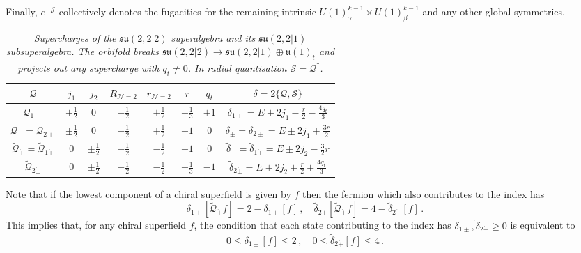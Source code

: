 \documentclass[main.tex]{subfiles}
\begin{document}
Finally, $e^{-\mathcal{J}}$ collectively denotes the fugacities for the remaining intrinsic $U(1)^{k-1}_{\gamma}\times  U(1)^{k-1}_{\beta}$ and any other global symmetries.
\begin{table}
\centering
\begin{tabular}{ |c||c|c|c|c|c|c|c| } 
 \hline
 $\mathcal{Q}$ & $j_1$ & $j_2$ & $R_{\mathcal{N}=2}$ & $r_{\mathcal{N}=2}$ & $r$ & $q_t$&$\delta=2\{\mathcal{Q},\mathcal{S}\}$ \\[2pt] 
  \hline\hline
 $\mathcal{Q}_{1\pm}$ & $\pm\frac{1}{2}$ & $0$ & $+\frac{1}{2}$ & $+\frac{1}{2}$ & $+\frac{1}{3}$ & $+1$ &$\delta_{1\pm}=E\pm2j_1-\frac{r}{2}-\frac{4q_t}{3}$\\[2pt] \hline
$\mathcal{Q}_{\pm}=\mathcal{Q}_{2\pm}$ & $\pm\frac{1}{2}$ & $0$ & $-\frac{1}{2}$ & $+\frac{1}{2}$ & $-1$ & $0$&$\delta_{\pm}=\delta_{2\pm}=E\pm2j_1+\frac{3r}{2}$ \\ [2pt]\hline
$\widetilde{\mathcal{Q}}_{\dot\pm}=\widetilde{\mathcal{Q}}_{1\dot\pm}$ & $0$ & $\pm\frac{1}{2}$ & $+\frac{1}{2}$ & $-\frac{1}{2}$ & $+1$ & $0$&$\widetilde{\delta}_{\dot-}=\widetilde{\delta}_{1\dot\pm}=E\pm2j_2-\frac{3}{2}r$ \\ [2pt]\hline
$\widetilde{\mathcal{Q}}_{2\dot\pm}$ & $0$ & $\pm\frac{1}{2}$ & $-\frac{1}{2}$ & $-\frac{1}{2}$ & $-\frac{1}{3}$ & $-1$&$\widetilde{\delta}_{2\dot\pm}=E\pm2j_2+\frac{r}{2}+\frac{4q_t}{3}$ \\ [2pt]\hline
\end{tabular}
\caption{\textit{Supercharges of the $\mathfrak{su}(2,2|2)$ superalgebra and its $\mathfrak{su}(2,2|1)$ subsuperalgebra. The orbifold breaks $\mathfrak{su}(2,2|2)\xrightarrow[]{}\mathfrak{su}(2,2|1)\oplus\mathfrak{u}(1)_t$ and projects out any supercharge with $q_t\neq0$. In radial quantisation $\mathcal{S}=\mathcal{Q}^{\dagger}$.}}
\label{tab:supercharges}
\end{table}
Note that if the lowest component of a chiral superfield is given by $f$ then the fermion which also contributes to the index has 
\begin{equation}
\delta_{1\pm}[\mathcal{\widetilde{Q}}_{\dot+}\overline{f}]=2-\delta_{1\pm}[f]\,,\quad \widetilde{\delta}_{2\dot+}[\mathcal{\widetilde{Q}}_{\dot+}\overline{f}]=4-\widetilde{\delta}_{2\dot+}[f]\,.
\end{equation}
This implies that, for any chiral superfield $f$, the condition that each state contributing to the index has $\delta_{1\pm},\widetilde{\delta}_{2\dot+}\geq0$ is equivalent to
\begin{equation}
0\leq\delta_{1\pm}[f]\leq2\,,\quad 0\leq\widetilde{\delta}_{2\dot+}[f]\leq4\,.
\end{equation}
\end{document}
